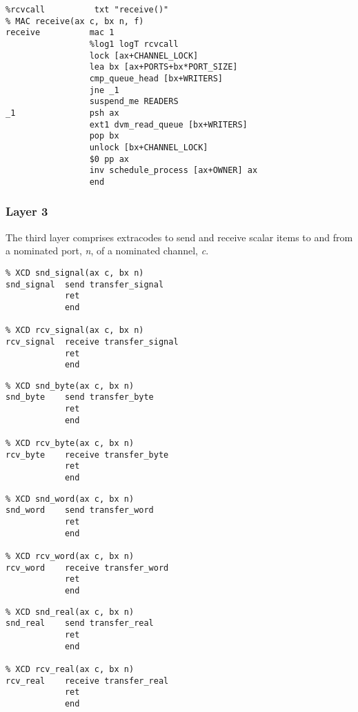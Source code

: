 {\small
\begin{verbatim}
%rcvcall          txt "receive()"
% MAC receive(ax c, bx n, f)
receive          mac 1
                 %log1 logT rcvcall
                 lock [ax+CHANNEL_LOCK]
                 lea bx [ax+PORTS+bx*PORT_SIZE]
                 cmp_queue_head [bx+WRITERS]
                 jne _1
                 suspend_me READERS
_1               psh ax
                 ext1 dvm_read_queue [bx+WRITERS]
                 pop bx
                 unlock [bx+CHANNEL_LOCK]
                 $0 pp ax
                 inv schedule_process [ax+OWNER] ax
                 end
\end{verbatim}}


\subsubsection{Layer 3}
The third layer comprises extracodes to send and receive scalar items to and from a nominated port, \emph{n}, of a nominated channel, \emph{c}.

{\small
\begin{verbatim}
% XCD snd_signal(ax c, bx n)
snd_signal  send transfer_signal
            ret
            end

% XCD rcv_signal(ax c, bx n)
rcv_signal  receive transfer_signal
            ret
            end
\end{verbatim}}

{\small
\begin{verbatim}
% XCD snd_byte(ax c, bx n)
snd_byte    send transfer_byte
            ret
            end

% XCD rcv_byte(ax c, bx n)
rcv_byte    receive transfer_byte
            ret
            end
\end{verbatim}}

{\small
\begin{verbatim}
% XCD snd_word(ax c, bx n)
snd_word    send transfer_word
            ret
            end

% XCD rcv_word(ax c, bx n)
rcv_word    receive transfer_word
            ret
            end
\end{verbatim}}

{\small
\begin{verbatim}
% XCD snd_real(ax c, bx n)
snd_real    send transfer_real
            ret
            end

% XCD rcv_real(ax c, bx n)
rcv_real    receive transfer_real
            ret
            end
\end{verbatim}}

